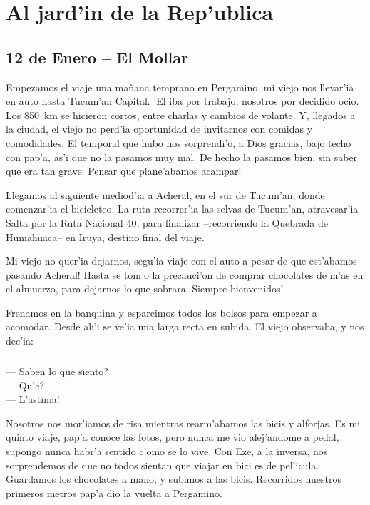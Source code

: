 \section{Al jard'in de la Rep'ublica}

\subsection*{12 de Enero -- El Mollar}

Empezamos el viaje una ma\~nana temprano en Pergamino, mi viejo nos llevar'ia en
auto hasta Tucum'an Capital. 'El iba por trabajo, nosotros por decidido ocio.
Los 850~km se hicieron cortos, entre charlas y cambios de volante. Y, llegados a
la ciudad, el viejo no perd'ia oportunidad de invitarnos con comidas y
comodidades. El temporal que hubo nos sorprendi'o, a Dios gracias, bajo techo
con pap'a, as'i que no la pasamos muy mal. De hecho la pasamos bien, sin saber
que era tan grave. \textexclamdown Pensar que plane'abamos acampar!

Llegamos al siguiente mediod'ia a Acheral, en el sur de Tucum'an, donde
comenzar'ia el bicicleteo. La ruta recorrer'ia las selvas de Tucum'an,
atravesar'ia Salta por la Ruta Nacional 40, para finalizar --recorriendo la
Quebrada de Humahuaca-- en Iruya, destino final del viaje.

Mi viejo no quer'ia dejarnos, \textexclamdown segu'ia viaje con el auto a pesar
de que est'abamos pasando Acheral! Hasta se tom'o la precauci'on de comprar
chocolates de m'as en el almuerzo, para dejarnos lo que sobrara. \textexclamdown
Siempre bienvenidos!

Frenamos en la banquina y esparcimos todos los bolsos para empezar a acomodar.
Desde ah'i se ve'ia una larga recta en subida. El viejo observaba, y nos dec'ia:

\subparagraph{}\label{ssub:papa} --- \textquestiondown Saben lo que siento?\\
--- \textquestiondown Qu'e?\\ --- \textexclamdown L'astima!\\ \hangindent=1cm

Nosotros nos mor'iamos de risa mientras rearm'abamos las bicis y alforjas. Es mi
quinto viaje, pap'a conoce las fotos, pero nunca me vio alej'andome a pedal,
supongo nunca habr'a sentido c'omo se lo vive. Con Eze, a la inversa, nos
sorprendemos de que no todos sientan que viajar en bici es de pel'icula.
Guardamos los chocolates a mano, y subimos a las bicis. Recorridos nuestros
primeros metros pap'a dio la vuelta a Pergamino.

